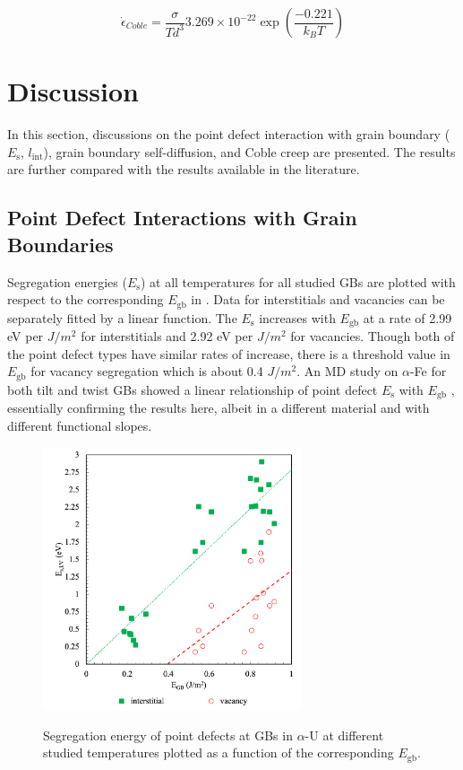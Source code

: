 \documentclass[review]{elsarticle}
\begin{document}
\begin{equation}
\label{eq:coble2}
\dot{\epsilon}_{Coble} =\frac{\sigma}{T d^{3}} 3.269 \times 10^{-22} \exp\left(\frac{-0.221}{k_{B} T}\right)
\end{equation}



\FloatBarrier

\section{Discussion}

In this section, discussions on the point defect interaction with grain boundary ($E_{\mathrm{s}}$, $l_{\mathrm{int}}$), grain boundary self-diffusion, and Coble creep are presented. The results are further compared with the results available in the literature. 

\subsection{Point Defect Interactions with Grain Boundaries}

\par Segregation energies ($E_{\mathrm{s}}$) at all temperatures for all studied GBs are plotted with respect to the corresponding  $E_{\mathrm{gb}}$  in . Data for interstitials and vacancies can be separately fitted by a linear function. The $E_{\mathrm{s}}$ increases with  $E_{\mathrm{gb}}$  at a rate of 2.99 eV per $J/m{^2}$ for interstitials and 2.92 eV per $J/m^2$ for vacancies. Though both of the point defect types have similar rates of increase, there is a threshold value in $E_{\mathrm{gb}}$ for vacancy segregation which is about 0.4 $J/m^2$. An MD study on $\alpha$-Fe for both tilt and twist GBs showed a linear relationship of point defect $E_{\mathrm{s}}$ with $E_{\mathrm{gb}}$ \cite{tschopp2012probing}, essentially confirming the results here, albeit in a different material and with different functional slopes. 

\begin{figure}[h!]
\centering
\includegraphics[width = 3in]{13_SE_GB.png}\\
\caption{Segregation energy of point defects at GBs in $\alpha$-U at different studied temperatures plotted as a function of the corresponding $E_{\mathrm{gb}}$.}
\label{fig:SE_GB}
\end{figure}
\end{document}
